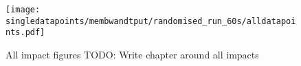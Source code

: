 \begin{figure}[t]
\texttt{[image: singledatapoints/membwandtput/randomised\_run\_60s/alldatapoints.pdf]}
\caption{All impact figures TODO: Write chapter around all impacts}
\label{fig:impact}
\end{figure}
